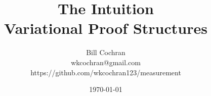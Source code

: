 \documentclass[12pt,oneside]{book}
\begin{document}
\title{The Intuition\\
\large Variational Proof Structures}

\author{Bill Cochran\\wkcochran@gmail.com\\https://github.com/wkcochran123/measurement}
\date{\today}

\maketitle

\tableofcontents










\end{document}
